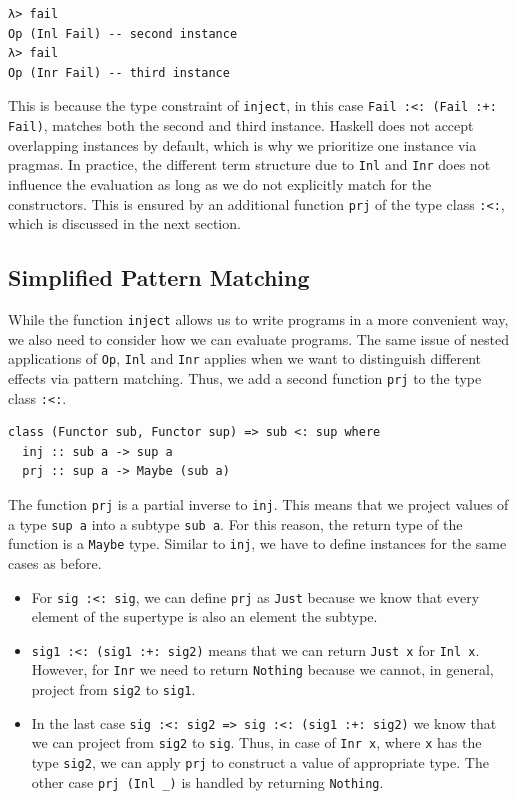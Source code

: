 \documentclass[a4paper, 11pt, fleqn, twoside, abstract=on]{scrreprt}
\newcommand{\hinl}[1]{\texttt{#1}}
\begin{document}
\begin{verbatim}
λ> fail
Op (Inl Fail) -- second instance
λ> fail
Op (Inr Fail) -- third instance
\end{verbatim}

This is because the type constraint of \hinl{inject}, in this case \hinl{Fail :<: (Fail :+: Fail)}, matches both the second and third instance.
Haskell does not accept overlapping instances by default, which is why we prioritize one instance via pragmas.
In practice, the different term structure due to \hinl{Inl} and \hinl{Inr} does not influence the evaluation as long as we do not explicitly match for the constructors.
This is ensured by an additional function \hinl{prj} of the type class \hinl{:<:}, which is discussed in the next section.

\subsection{Simplified Pattern Matching}
While the function \hinl{inject} allows us to write programs in a more convenient way, we also need to consider how we can evaluate programs.
The same issue of nested applications of \hinl{Op}, \hinl{Inl} and \hinl{Inr} applies when we want to distinguish different effects via pattern matching.
Thus, we add a second function \hinl{prj} to the type class \hinl{:<:}.

\begin{verbatim}
class (Functor sub, Functor sup) => sub <: sup where
  inj :: sub a -> sup a
  prj :: sup a -> Maybe (sub a)
\end{verbatim}

The function \hinl{prj} is a partial inverse to \hinl{inj}.
This means that we project values of a type \hinl{sup a} into a subtype \hinl{sub a}.
For this reason, the return type of the function is a \hinl{Maybe} type.
Similar to \hinl{inj}, we have to define instances for the same cases as before.

\begin{itemize}
\item For \hinl{sig :<: sig}, we can define \hinl{prj} as \hinl{Just} because we know that every element of the supertype is also an element the subtype.

\item \hinl{sig1 :<: (sig1 :+: sig2)} means that we can return \hinl{Just x} for \hinl{Inl x}.
However, for \hinl{Inr} we need to return \hinl{Nothing} because we cannot, in general, project from \hinl{sig2} to \hinl{sig1}.

\item In the last case \hinl{sig :<: sig2 => sig :<: (sig1 :+: sig2)} we know that we can project from \hinl{sig2} to \hinl{sig}.
Thus, in case of \hinl{Inr x}, where \hinl{x} has the type \hinl{sig2}, we can apply \hinl{prj} to construct a value of appropriate type.
The other case \hinl{prj (Inl _)} is handled by returning \hinl{Nothing}.
\end{itemize}
\end{document}
